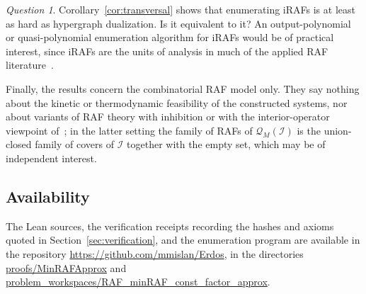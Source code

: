 \documentclass[11pt,a4paper]{article}
\theoremstyle{plain}
\theoremstyle{definition}
\theoremstyle{remark}
\newtheorem{question}[theorem]{Question}
\newcommand{\cQ}{\mathcal{Q}}
\newcommand{\cI}{\mathcal{I}}
\begin{document}
\begin{question}
Corollary~\ref{cor:transversal} shows that enumerating iRAFs is at least as hard as hypergraph dualization. Is it equivalent to it? An output-polynomial or quasi-polynomial enumeration algorithm for iRAFs would be of practical interest, since iRAFs are the units of analysis in much of the applied RAF literature~\cite{hordijk2012structure,hordijk2015algorithms,steel2020structure}.
\end{question}

Finally, the results concern the combinatorial RAF model only. They say nothing about the kinetic or thermodynamic feasibility of the constructed systems, nor about variants of RAF theory with inhibition or with the interior-operator viewpoint of~\cite{steel2023interior}; in the latter setting the family of RAFs of $\cQ_M(\cI)$ is the union-closed family of covers of $\cI$ together with the empty set, which may be of independent interest.

\subsection*{Availability}

The Lean sources, the verification receipts recording the hashes and axioms quoted in Section~\ref{sec:verification}, and the enumeration program are available in the repository \url{https://github.com/mmislan/Erdos}, in the directories \url{proofs/MinRAFApprox} and \url{problem_workspaces/RAF_minRAF_const_factor_approx}.



\end{document}
